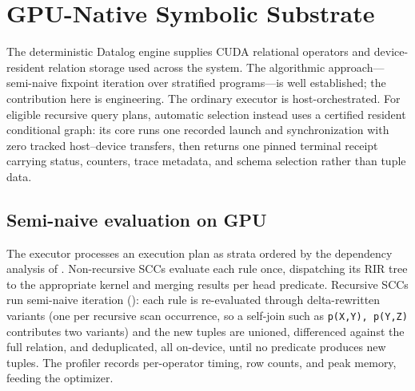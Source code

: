 \section{GPU-Native Symbolic Substrate}\label{sec:datalog}

The deterministic Datalog engine supplies CUDA relational operators and device-resident relation storage used across the system. The algorithmic approach---semi-naive fixpoint iteration over stratified programs---is well established; the contribution here is engineering. The ordinary executor is host-orchestrated. For eligible recursive query plans, automatic selection instead uses a certified resident conditional graph: its core runs one recorded launch and synchronization with zero tracked host--device transfers, then returns one pinned terminal receipt carrying status, counters, trace metadata, and schema selection rather than tuple data.

\subsection{Semi-naive evaluation on GPU}

The executor processes an execution plan as strata ordered by the dependency analysis of . Non-recursive SCCs evaluate each rule once, dispatching its RIR tree to the appropriate kernel and merging results per head predicate. Recursive SCCs run semi-naive iteration (): each rule is re-evaluated through delta-rewritten variants (one per recursive scan occurrence, so a self-join such as \texttt{p(X,Y), p(Y,Z)} contributes two variants) and the new tuples are unioned, differenced against the full relation, and deduplicated, all on-device, until no predicate produces new tuples. The profiler records per-operator timing, row counts, and peak memory, feeding the optimizer.

